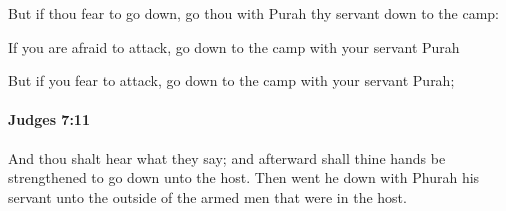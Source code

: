 			\begin{versebox}
					\item[BHS] 
					\item[ASV] But if thou fear to go down, go thou with Purah thy servant down to the camp:
					\item[NIV] If you are afraid to attack, go down to the camp with your servant Purah
					\item[NRSV] But if you fear to attack, go down to the camp with your servant Purah;
			\end{versebox}

		\paragraph{Judges 7:11} %
			\label{JUDGES-7-11}

			And thou shalt hear what they say; and afterward shall thine hands be strengthened to go down unto the host. Then went he down with Phurah his servant unto the outside of the armed men that were in the host.

